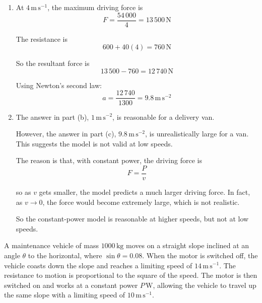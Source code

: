 \documentclass[leqno]{article}
\begin{document}
\begin{enumerate}[
  label=\textbf{\arabic*.},
  leftmargin=*,
  topsep=0pt,
  partopsep=0pt,
  parsep=0pt
]
\begin{djsSolution}
\begin{enumerate}[label=\textbf{(\alph*)}, start=1]
The resistance at \(20\,\mathrm{m\,s^{-1}}\) is
\[
600+40(20)=1400\,\mathrm{N}
\]

Therefore the resultant forward force is
\[
2700-1400=1300\,\mathrm{N}
\]

Take the direction of motion as positive. Using Newton's second law:
\[
1300 = 1300a
\]

so
\[
a=1\,\mathrm{m\,s^{-2}}
\]

  \item At \(4\,\mathrm{m\,s^{-1}}\), the maximum driving force is
\[
F=\frac{54\,000}{4}=13\,500\,\mathrm{N}
\]

The resistance is
\[
600+40(4)=760\,\mathrm{N}
\]

So the resultant force is
\[
13\,500-760=12\,740\,\mathrm{N}
\]

Using Newton's second law:
\[
a=\frac{12\,740}{1300}=9.8\,\mathrm{m\,s^{-2}}
\]

  \item The answer in part (b), \(1\,\mathrm{m\,s^{-2}}\), is reasonable for a delivery van.

However, the answer in part (c), \(9.8\,\mathrm{m\,s^{-2}}\), is unrealistically large for a van. This suggests the model is not valid at low speeds.

The reason is that, with constant power, the driving force is
\[
F=\frac{P}{v}
\]

so as \(v\) gets smaller, the model predicts a much larger driving force. In fact, as \(v \to 0\), the force would become extremely large, which is not realistic.

So the constant-power model is reasonable at higher speeds, but not at low speeds.
\end{enumerate}
\end{djsSolution}


\newpage

\questionitem

A maintenance vehicle of mass $1000\,\mathrm{kg}$ moves on a straight slope inclined at an angle $\theta$ to the horizontal, where $\sin\theta=0.08$. When the motor is switched off, the vehicle coasts down the slope and reaches a limiting speed of $14\,\mathrm{m\,s^{-1}}$. The resistance to motion is proportional to the square of the speed. The motor is then switched on and works at a constant power $P\,\mathrm{W}$, allowing the vehicle to travel up the same slope with a limiting speed of $10\,\mathrm{m\,s^{-1}}$. \\


\end{enumerate}
\end{document}
